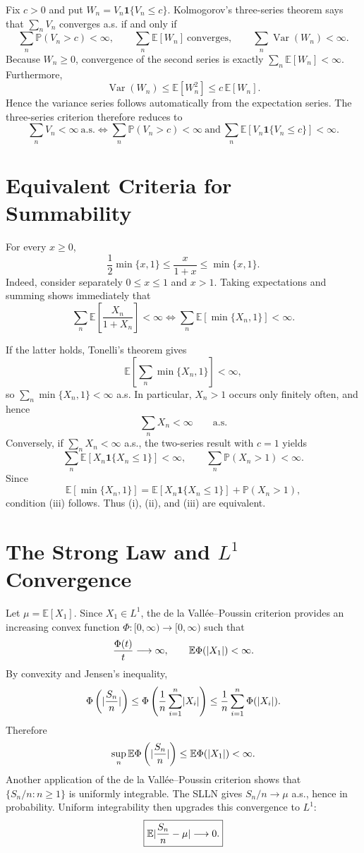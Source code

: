 \documentclass[11pt]{article}
\newcommand{\bbE}{\mathbb{E}}
\newcommand{\bbP}{\mathbb{P}}
\newcommand{\ind}{\mathbf{1}}
\DeclarePairedDelimiter{\abs}{\lvert}{\rvert}
\DeclareMathOperator{\Var}{Var}
\begin{document}
Fix $c>0$ and put $W_n=V_n\ind\{V_n\leq c\}$. Kolmogorov's
three-series theorem says that $\sum_nV_n$ converges a.s. if and only if
\[
\sum_n\bbP(V_n>c)<\infty,
\qquad
\sum_n\bbE[W_n]\ \text{converges},
\qquad
\sum_n\Var(W_n)<\infty.
\]
Because $W_n\geq0$, convergence of the second series is exactly
$\sum_n\bbE[W_n]<\infty$. Furthermore,
\[
\Var(W_n)\leq\bbE[W_n^2]\leq c\,\bbE[W_n].
\]
Hence the variance series follows automatically from the expectation series.
The three-series criterion therefore reduces to
\[
\boxed{
\sum_nV_n<\infty\ \text{a.s.}
\iff
\sum_n\bbP(V_n>c)<\infty
\ \text{and}\ 
\sum_n\bbE[V_n\ind\{V_n\leq c\}]<\infty.}
\]

\section{Equivalent Criteria for Summability}

For every $x\geq0$,
\[
\frac12\min\{x,1\}
\leq\frac{x}{1+x}
\leq\min\{x,1\}.
\]
Indeed, consider separately $0\leq x\leq1$ and $x>1$. Taking
expectations and summing shows immediately that
\[
\sum_n\bbE\left[\frac{X_n}{1+X_n}\right]<\infty
\iff
\sum_n\bbE[\min\{X_n,1\}]<\infty.
\]

If the latter holds, Tonelli's theorem gives
\[
\bbE\left[\sum_n\min\{X_n,1\}\right]<\infty,
\]
so $\sum_n\min\{X_n,1\}<\infty$ a.s. In particular, $X_n>1$
occurs only finitely often, and hence
\[
\sum_nX_n<\infty\qquad\text{a.s.}
\]
Conversely, if $\sum_nX_n<\infty$ a.s., the two-series result with
$c=1$ yields
\[
\sum_n\bbE[X_n\ind\{X_n\leq1\}]<\infty,
\qquad
\sum_n\bbP(X_n>1)<\infty.
\]
Since
\[
\bbE[\min\{X_n,1\}]
=\bbE[X_n\ind\{X_n\leq1\}]+\bbP(X_n>1),
\]
condition (iii) follows. Thus (i), (ii), and (iii) are equivalent.

\section{The Strong Law and \(L^1\) Convergence}

Let $\mu=\bbE[X_1]$. Since $X_1\in L^1$, the de la
Vall\'ee--Poussin criterion provides an increasing convex function
$\Phi:[0,\infty)\to[0,\infty)$ such that
\[
\frac{\Phi(t)}{t}\longrightarrow\infty,
\qquad
\bbE\Phi(\abs{X_1})<\infty.
\]
By convexity and Jensen's inequality,
\[
\Phi\left(\abs{\frac{S_n}{n}}\right)
\leq
\Phi\left(\frac1n\sum_{i=1}^n\abs{X_i}\right)
\leq
\frac1n\sum_{i=1}^n\Phi(\abs{X_i}).
\]
Therefore
\[
\sup_n\bbE\Phi\left(\abs{\frac{S_n}{n}}\right)
\leq\bbE\Phi(\abs{X_1})<\infty.
\]
Another application of the de la Vall\'ee--Poussin criterion shows that
$\{S_n/n:n\geq1\}$ is uniformly integrable. The SLLN gives
$S_n/n\to\mu$ a.s., hence in probability. Uniform integrability then
upgrades this convergence to $L^1$:
\[
\boxed{
\bbE\abs{\frac{S_n}{n}-\mu}\longrightarrow0.}
\]
\end{document}
